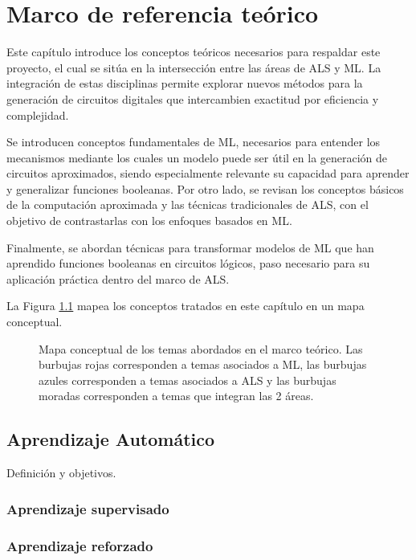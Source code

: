 \chapter{Marco de referencia teórico}

Este capítulo introduce los conceptos teóricos necesarios para respaldar este
proyecto, el cual se sitúa en la intersección entre las áreas de ALS y ML. La
integración de estas disciplinas permite explorar nuevos métodos para la
generación de circuitos digitales que intercambien exactitud por eficiencia y
complejidad.

Se introducen conceptos fundamentales de ML, necesarios para entender los
mecanismos mediante los cuales un modelo puede ser útil en la generación de
circuitos aproximados, siendo especialmente relevante su capacidad para
aprender y generalizar funciones booleanas. Por otro lado, se revisan los
conceptos básicos de la computación aproximada y las técnicas tradicionales de
ALS, con el objetivo de contrastarlas con los enfoques basados en ML.

Finalmente, se abordan técnicas para transformar modelos de ML que han
aprendido funciones booleanas en circuitos lógicos, paso necesario para su
aplicación práctica dentro del marco de ALS.

La Figura \ref{fig:mapa_conceptual} mapea los conceptos tratados en
este capítulo en un mapa conceptual.

\begin{figure}[ht]
  \centering
  
  \caption{Mapa conceptual de los temas abordados en el marco teórico. Las burbujas rojas corresponden a temas asociados a ML, las burbujas azules corresponden a temas asociados a ALS y las burbujas moradas corresponden a temas que integran las 2 áreas.}
  \label{fig:mapa_conceptual}
\end{figure}

\section{Aprendizaje Automático}

Definición y objetivos.

\subsection{Aprendizaje supervisado}

\subsection{Aprendizaje reforzado}

